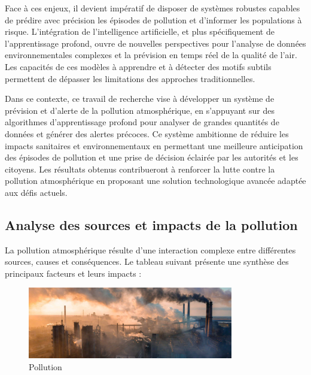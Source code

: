 \documentclass[12pt,a4paper]{report}
\begin{document}
Face à ces enjeux, il devient impératif de disposer de systèmes robustes capables de prédire avec précision les épisodes de pollution et d’informer les populations à risque. L’intégration de l’intelligence artificielle, et plus spécifiquement de l’apprentissage profond, ouvre de nouvelles perspectives pour l’analyse de données environnementales complexes et la prévision en temps réel de la qualité de l’air. Les capacités de ces modèles à apprendre et à détecter des motifs subtils permettent de dépasser les limitations des approches traditionnelles.

Dans ce contexte, ce travail de recherche vise à développer un système de prévision et d’alerte de la pollution atmosphérique, en s’appuyant sur des algorithmes d’apprentissage profond pour analyser de grandes quantités de données et générer des alertes précoces. Ce système ambitionne de réduire les impacts sanitaires et environnementaux en permettant une meilleure anticipation des épisodes de pollution et une prise de décision éclairée par les autorités et les citoyens. Les résultats obtenus contribueront à renforcer la lutte contre la pollution atmosphérique en proposant une solution technologique avancée adaptée aux défis actuels.
\subsection{Analyse des sources et impacts de la pollution}
La pollution atmosphérique résulte d'une interaction complexe entre différentes sources, causes et conséquences. Le tableau suivant présente une synthèse des principaux facteurs et leurs impacts :
\begin{figure}[h]
    \centering
    \includegraphics[width=0.8\textwidth]{pollution.png}
    \caption{Pollution}
    \label{fig:Pollution}
\end{figure}
\end{document}
